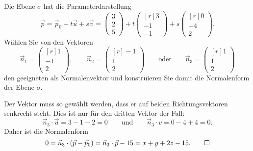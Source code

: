 Die Ebene $\sigma$ hat die Parameterdarstellung
\[
\vec{p}
=
\vec{p}_0
+
t\vec{u}
+
s\vec{v}
=
\begin{pmatrix}
3\\2\\5
\end{pmatrix}
+
t
\begin{pmatrix*}[r]
3\\-1\\-1
\end{pmatrix*}
+
s
\begin{pmatrix*}[r]
0\\-4\\2
\end{pmatrix*}.
\]
Wählen Sie von den Vektoren
\[
\vec{n}_1
=
\begin{pmatrix*}[r]
1\\-1\\2
\end{pmatrix*},
\qquad
\vec{n}_2
=
\begin{pmatrix*}[r]
-1\\1\\2
\end{pmatrix*}
\qquad\text{oder}\qquad
\vec{n}_3
=
\begin{pmatrix*}[r]
1\\1\\2
\end{pmatrix*}
\]
den geeigneten als Normalenvektor
und konstruieren Sie damit die Normalenform der Ebene $\sigma$.

\begin{loesung}
Der Vektor muss so gewählt werden, dass er auf beiden Richtungsvektoren
senkrecht steht.
Dies ist nur für den dritten Vektor der Fall:
\[
\vec{n}_3\cdot\vec{u}
=
3-1-2
=
0
\qquad\text{und}\qquad
\vec{n}_3\cdot{v}
=
0-4+4
=
0.
\]
Daher ist die Normalenform
\[
0
=
\vec{n}_3\cdot(\vec{p}-\vec{p}_0)
=
\vec{n}_3\cdot\vec{p} - 15
=
x+y+2z-15.
\qedhere
\]
\end{loesung}

